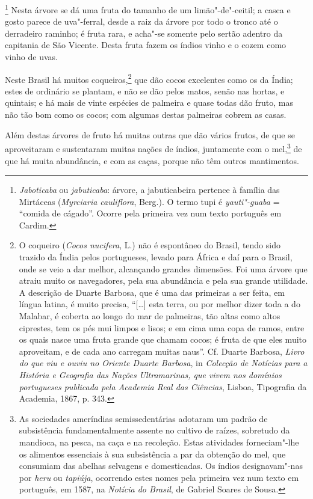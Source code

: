 \begin{linenumbers}
\footnote{ \textit{Jaboticaba} ou
\textit{jabuticaba}: árvore, a jabuticabeira pertence à família das
Mirtáceas (\textit{Myrciaria cauliflora}, Berg.). O termo tupi é
\textit{yauti"-guaba} = ``comida de cágado''. Ocorre pela primeira vez num
texto português em Cardim.} Nesta árvore se dá uma fruta do
tamanho de um limão"-de"-ceitil; a casca e gosto parece de uva"-ferral,
desde a raiz da árvore por todo o tronco até o derradeiro raminho; é
fruta rara, e acha"-se somente pelo sertão adentro da capitania de São
Vicente. Desta fruta fazem os índios vinho e o cozem como vinho de uvas.

\enlargethispage{\baselineskip}

Neste Brasil há muitos coqueiros,\footnote{ O coqueiro (\textit{Cocos
nucifera}, L.) não é espontâneo do Brasil, tendo sido trazido da Índia
pelos portugueses, levado para África e daí para o Brasil, onde se veio
a dar melhor, alcançando grandes dimensões. Foi uma árvore que atraiu
muito os navegadores, pela sua abundância e pela sua grande utilidade.
A descrição de Duarte Barbosa, que é uma das primeiras a ser feita, em
língua latina, é muito precisa, ``[\ldots{}] esta terra, ou por
melhor dizer toda a do Malabar, é coberta ao longo do mar de palmeiras,
tão altas como altos ciprestes, tem os pés mui limpos e lisos; e em
cima uma copa de ramos, entre os quais nasce uma fruta grande que
chamam cocos; é fruta de que eles muito aproveitam, e de cada ano
carregam muitas naus''. Cf. Duarte Barbosa, \textit{Livro do
que viu e ouviu no Oriente Duarte Barbosa}, in \textit{Colecção de
Notícias para a História e Geografia das Nações Ultramarinas, que vivem
nos domínios portugueses publicada pela Academia Real das Ciências}, 
Lisboa, Tipografia da Academia, 1867, p. 343.} que dão cocos
excelentes como os da Índia; estes de ordinário se plantam, e não se
dão pelos matos, senão nas hortas, e quintais; e há mais de vinte
espécies de palmeira e quase todas dão fruto, mas não tão bom como os
cocos; com algumas destas palmeiras cobrem as casas.

 Além destas árvores de fruto há muitas outras que dão vários frutos, de
que se aproveitaram e sustentaram muitas nações de índios, juntamente
com o mel,\footnote{ As sociedades ameríndias semissedentárias
adotaram um padrão de subsistência fundamentalmente assente no
cultivo de raízes, sobretudo da mandioca, na pesca, na caça e na
recoleção. Estas atividades forneciam"-lhe os alimentos essenciais à
sua subsistência a par da obtenção do mel, que consumiam das abelhas
selvagens e domesticadas. Os índios designavam"-nas por \textit{heru} ou
\textit{tapiúja}, ocorrendo estes nomes pela primeira vez num texto em
português, em 1587, na \textit{Notícia do Brasil}, de Gabriel Soares de
Sousa.} de que há muita abundância, e com as caças, porque não têm outros mantimentos.


\end{linenumbers}
